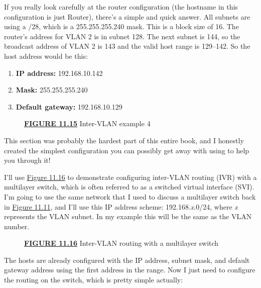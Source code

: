 \documentclass[b5paper,11pt]{memoir}
\begin{document}
If you really look carefully at the router configuration (the hostname
in this configuration is just Router), there's a simple and quick
answer. All subnets are using a /28, which is a 255.255.255.240 mask.
This is a block size of 16. The router's address for VLAN 2 is in subnet
128. The next subnet is 144, so the broadcast address of VLAN 2 is 143
and the valid host range is 129--142. So the host address would be this:

\begin{enumerate}
\tightlist
\item
  \textbf{IP address:} 192.168.10.142
\item
  \textbf{Mask:} 255.255.255.240
\item
  \textbf{Default gateway:} 192.168.10.129
\end{enumerate}



\begin{figure}
\centering
\caption{{\protect\hyperlink{c11.xhtmlux5cux23figureanchor11-15}{\textbf{FIGURE
11.15}} Inter-VLAN example 4}}
\end{figure}

This section was probably the hardest part of this entire book, and I
honestly created the simplest configuration you can possibly get away
with using to help you through it!

I'll use \protect\hyperlink{c11.xhtmlux5cux23figure11-16}{Figure 11.16}
to demonstrate configuring inter-VLAN routing (IVR) with a multi­layer
switch, which is often referred to as a switched virtual interface
(SVI). I'm going to use the same network that I used to discuss a
multilayer switch back in
\protect\hyperlink{c11.xhtmlux5cux23figure11-11}{Figure 11.11}, and I'll
use this IP address scheme: 192.168.\emph{x}.0/24, where \emph{x}
represents the VLAN subnet. In my example this will be the same as the
VLAN number.

\begin{figure}
\centering
\caption{{\protect\hyperlink{c11.xhtmlux5cux23figureanchor11-16}{\textbf{FIGURE
11.16}} Inter-VLAN routing with a multilayer switch}}
\end{figure}

The hosts are already configured with the IP address, subnet mask, and
default gateway address using the first address in the range. Now I just
need to configure the routing on the switch, which is pretty simple
actually:
\end{document}
